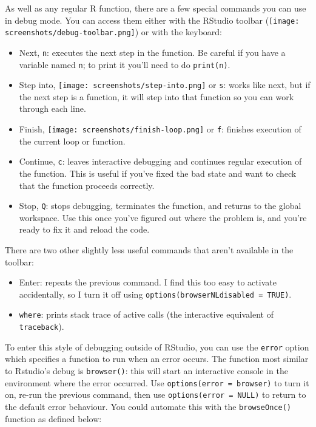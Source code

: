 As well as any regular R function, there are a few special commands you
can use in debug mode. You can access them either with the RStudio
toolbar (\texttt{[image: screenshots/debug-toolbar.png]})
or with the keyboard:

\begin{itemize}
\item
  Next, \texttt{n}: executes the next step in the function. Be careful
  if you have a variable named \texttt{n}; to print it you'll need to do
  \texttt{print(n)}.
\item
  Step into, \texttt{[image: screenshots/step-into.png]}
  or \texttt{s}: works like next, but if the next step is a function, it
  will step into that function so you can work through each line.
\item
  Finish, \texttt{[image: screenshots/finish-loop.png]} or
  \texttt{f}: finishes execution of the current loop or function.
\item
  Continue, \texttt{c}: leaves interactive debugging and continues
  regular execution of the function. This is useful if you've fixed the
  bad state and want to check that the function proceeds correctly.
\item
  Stop, \texttt{Q}: stops debugging, terminates the function, and
  returns to the global workspace. Use this once you've figured out
  where the problem is, and you're ready to fix it and reload the code.
\end{itemize}

There are two other slightly less useful commands that aren't available
in the toolbar:

\begin{itemize}
\item
  Enter: repeats the previous command. I find this too easy to activate
  accidentally, so I turn it off using
  \texttt{options(browserNLdisabled\ =\ TRUE)}.
\item
  \texttt{where}: prints stack trace of active calls (the interactive
  equivalent of \texttt{traceback}).
\end{itemize}

To enter this style of debugging outside of RStudio, you can use the
\texttt{error} option which specifies a function to run when an error
occurs. The function most similar to Rstudio's debug is
\texttt{browser()}: this will start an interactive console in the
environment where the error occurred. Use
\texttt{options(error\ =\ browser)} to turn it on, re-run the previous
command, then use \texttt{options(error\ =\ NULL)} to return to the
default error behaviour. You could automate this with the
\texttt{browseOnce()} function as defined below: 

